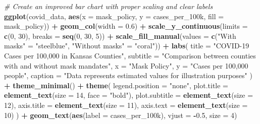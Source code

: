 \documentclass[
]{article}
\newenvironment{Shaded}{\begin{snugshade}}{\end{snugshade}}
\newcommand{\AttributeTok}[1]{\textcolor[rgb]{0.13,0.29,0.53}{#1}}
\newcommand{\CommentTok}[1]{\textcolor[rgb]{0.56,0.35,0.01}{\textit{#1}}}
\newcommand{\DecValTok}[1]{\textcolor[rgb]{0.00,0.00,0.81}{#1}}
\newcommand{\FloatTok}[1]{\textcolor[rgb]{0.00,0.00,0.81}{#1}}
\newcommand{\FunctionTok}[1]{\textcolor[rgb]{0.13,0.29,0.53}{\textbf{#1}}}
\newcommand{\NormalTok}[1]{#1}
\newcommand{\OtherTok}[1]{\textcolor[rgb]{0.56,0.35,0.01}{#1}}
\newcommand{\SpecialCharTok}[1]{\textcolor[rgb]{0.81,0.36,0.00}{\textbf{#1}}}
\newcommand{\StringTok}[1]{\textcolor[rgb]{0.31,0.60,0.02}{#1}}
\begin{document}
\begin{Shaded}
\begin{Highlighting}[]
\CommentTok{\# Create an improved bar chart with proper scaling and clear labels}
\FunctionTok{ggplot}\NormalTok{(covid\_data, }\FunctionTok{aes}\NormalTok{(}\AttributeTok{x =}\NormalTok{ mask\_policy, }\AttributeTok{y =}\NormalTok{ cases\_per\_100k, }\AttributeTok{fill =}\NormalTok{ mask\_policy)) }\SpecialCharTok{+}
  \FunctionTok{geom\_col}\NormalTok{(}\AttributeTok{width =} \FloatTok{0.6}\NormalTok{) }\SpecialCharTok{+}
  \FunctionTok{scale\_y\_continuous}\NormalTok{(}\AttributeTok{limits =} \FunctionTok{c}\NormalTok{(}\DecValTok{0}\NormalTok{, }\DecValTok{30}\NormalTok{), }\AttributeTok{breaks =} \FunctionTok{seq}\NormalTok{(}\DecValTok{0}\NormalTok{, }\DecValTok{30}\NormalTok{, }\DecValTok{5}\NormalTok{)) }\SpecialCharTok{+}
  \FunctionTok{scale\_fill\_manual}\NormalTok{(}\AttributeTok{values =} \FunctionTok{c}\NormalTok{(}\StringTok{"With masks"} \OtherTok{=} \StringTok{"steelblue"}\NormalTok{, }\StringTok{"Without masks"} \OtherTok{=} \StringTok{"coral"}\NormalTok{)) }\SpecialCharTok{+}
  \FunctionTok{labs}\NormalTok{(}
    \AttributeTok{title =} \StringTok{"COVID{-}19 Cases per 100,000 in Kansas Counties"}\NormalTok{,}
    \AttributeTok{subtitle =} \StringTok{"Comparison between counties with and without mask mandates"}\NormalTok{,}
    \AttributeTok{x =} \StringTok{"Mask Policy"}\NormalTok{,}
    \AttributeTok{y =} \StringTok{"Cases per 100,000 people"}\NormalTok{,}
    \AttributeTok{caption =} \StringTok{"Data represents estimated values for illustration purposes"}
\NormalTok{  ) }\SpecialCharTok{+}
  \FunctionTok{theme\_minimal}\NormalTok{() }\SpecialCharTok{+}
  \FunctionTok{theme}\NormalTok{(}
    \AttributeTok{legend.position =} \StringTok{"none"}\NormalTok{,}
    \AttributeTok{plot.title =} \FunctionTok{element\_text}\NormalTok{(}\AttributeTok{size =} \DecValTok{14}\NormalTok{, }\AttributeTok{face =} \StringTok{"bold"}\NormalTok{),}
    \AttributeTok{plot.subtitle =} \FunctionTok{element\_text}\NormalTok{(}\AttributeTok{size =} \DecValTok{12}\NormalTok{),}
    \AttributeTok{axis.title =} \FunctionTok{element\_text}\NormalTok{(}\AttributeTok{size =} \DecValTok{11}\NormalTok{),}
    \AttributeTok{axis.text =} \FunctionTok{element\_text}\NormalTok{(}\AttributeTok{size =} \DecValTok{10}\NormalTok{)}
\NormalTok{  ) }\SpecialCharTok{+}
  \FunctionTok{geom\_text}\NormalTok{(}\FunctionTok{aes}\NormalTok{(}\AttributeTok{label =}\NormalTok{ cases\_per\_100k), }\AttributeTok{vjust =} \SpecialCharTok{{-}}\FloatTok{0.5}\NormalTok{, }\AttributeTok{size =} \DecValTok{4}\NormalTok{)}
\end{Highlighting}
\end{Shaded}
\end{document}
